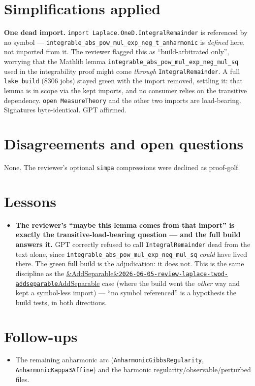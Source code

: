 \documentclass[11pt]{article}
\newcommand{\reviewref}[2][]{\href{https://therisensea.org/reviews/#2/}{\ifx&#1&\texttt{#2}\else#1\fi}}
\begin{document}
\section{Simplifications applied}
\textbf{One dead import.} \texttt{import Laplace.OneD.IntegralRemainder} is referenced by no
symbol --- \texttt{integrable\_abs\_pow\_mul\_exp\_neg\_t\_anharmonic} is \emph{defined} here, not
imported from it. The reviewer flagged this as ``build-arbitrated only'', worrying that the Mathlib
lemma \texttt{integrable\_abs\_pow\_mul\_exp\_neg\_mul\_sq} used in the integrability proof might
come \emph{through} \texttt{IntegralRemainder}. A full \texttt{lake build} ($8306$ jobs) stayed green
with the import removed, settling it: that lemma is in scope via the kept imports, and no consumer
relies on the transitive dependency. \texttt{open MeasureTheory} and the other two imports are
load-bearing. Signatures byte-identical. GPT affirmed.

\section{Disagreements and open questions}
None. The reviewer's optional \texttt{simpa} compressions were declined as proof-golf.

\section{Lessons}
\begin{itemize}[noitemsep]
  \item \textbf{The reviewer's ``maybe this lemma comes from that import'' is exactly the
    transitive-load-bearing question --- and the full build answers it.} GPT correctly refused to
    call \texttt{IntegralRemainder} dead from the text alone, since
    \texttt{integrable\_abs\_pow\_mul\_exp\_neg\_mul\_sq} \emph{could} have lived there. The green
    full build is the adjudication: it does not. This is the same discipline as the
    \reviewref[AddSeparable]{2026-06-05-review-laplace-twod-addseparable} case (where the build went
    the \emph{other} way and kept a symbol-less import) --- ``no symbol referenced'' is a hypothesis
    the build tests, in both directions.
\end{itemize}

\section{Follow-ups}
\begin{itemize}[noitemsep]
  \item The remaining anharmonic arc (\texttt{AnharmonicGibbsRegularity},
    \texttt{AnharmonicKappa3Affine}) and the harmonic regularity/observable/perturbed files.
\end{itemize}
\end{document}
